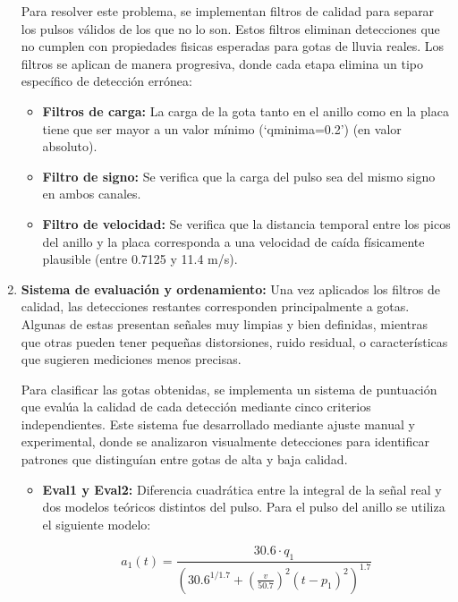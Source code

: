 \documentclass[12pt,a4paper]{article}
\begin{document}
\begin{enumerate}
Para resolver este problema, se implementan filtros de calidad para separar los pulsos válidos de los que no lo son. Estos filtros eliminan detecciones que no cumplen con propiedades fisicas esperadas para gotas de lluvia reales. Los filtros se aplican de manera progresiva, donde cada etapa elimina un tipo específico de detección errónea:

\begin{itemize}

\item \textbf{Filtros de carga:} La carga de la gota tanto en el anillo como en la placa tiene
que ser mayor a un valor mínimo (`qminima=0.2') (en valor absoluto).

\item \textbf{Filtro de signo:} Se verifica que la carga del pulso sea del mismo signo en
ambos canales.

\item \textbf{Filtro de velocidad:} Se verifica que la distancia temporal entre los picos del
anillo y la placa corresponda a una velocidad de caída físicamente plausible
(entre 0.7125 y 11.4 m/s).

\end{itemize}

\item \textbf{Sistema de evaluación y ordenamiento:} Una vez aplicados los filtros de calidad, las detecciones restantes corresponden principalmente a gotas. Algunas de estas presentan señales muy limpias y bien definidas, mientras que otras pueden tener pequeñas distorsiones, ruido residual, o características que sugieren mediciones menos precisas.

Para clasificar las gotas obtenidas, se implementa un sistema de puntuación que evalúa la calidad de cada detección mediante cinco criterios independientes. Este sistema fue desarrollado mediante ajuste manual y experimental, donde se analizaron visualmente detecciones para identificar patrones que distinguían entre gotas de alta y baja calidad.

\begin{itemize}

    \item \textbf{Eval1 y Eval2:} Diferencia cuadrática entre la integral de la señal real y dos modelos teóricos distintos
    del pulso.
    Para el pulso del anillo se utiliza el siguiente modelo:
    
    \begin{equation}
        a_1(t) = \frac{30.6 \cdot q_1}{\left(30.6^{1/1.7} + \left(\frac{v}{50.7}\right)^2(t-p_1)^2\right)^{1.7}}
    \end{equation}
    

\end{itemize}
\end{enumerate}
\end{document}
